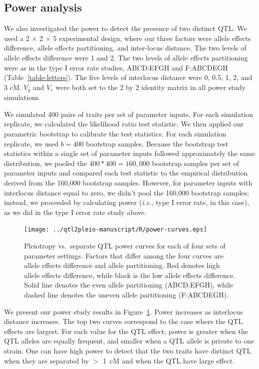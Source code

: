 \documentclass[oneside]{book}\usepackage[]{graphicx}\usepackage[]{color}
\begin{document}
\subsection{Power analysis}

We also investigated the power to detect the presence of two
distinct QTL. We used a 2 $\times$ 2 $\times$ 5 experimental design, where our
three factors were allele effects difference, allele effects
partitioning, and inter-locus distance. The two levels of allele
effects difference were 1 and 2. The two levels of allele effects
partitioning were as in the type I error rate studies, ABCD:EFGH and
F:ABCDEGH (Table~\ref{table-letters}). The five levels of interlocus
distance were 0, 0.5, 1, 2, and 3 cM. $V_g$ and $V_e$ were both set to
the 2 by 2 identity matrix in all power study simulations.

We simulated 400 pairs of traits per set of parameter inputs. For
each simulation replicate, we calculated the likelihood ratio test
statistic. We then applied our parametric bootstrap to calibrate the
test statistics. For each simulation replicate, we used $b = 400$ bootstrap
samples. Because the bootstrap test statistics within a single set of
parameter inputs followed approximately the same distribution, we
pooled the $400 * 400 = 160,000$ bootstrap samples per set of
parameter inputs and compared each test statistic to the empirical
distribution derived from the 160,000 bootstrap samples. However, for
parameter inputs with interlocus distance equal to zero, we didn't
pool the 160,000 bootstrap samples; instead, we proceeded by
calculating power (\textit{i.e.}, type I error rate, in this case), as we did in the
type I error rate study above.

\begin{figure}
\texttt{[image: ../qtl2pleio-manuscript/R/power-curves.eps]}
\caption{Pleiotropy vs.\ separate QTL power curves for each of four
  sets of parameter settings. Factors that differ among the four
  curves are allele effects difference and allele partitioning. Red denotes high allele effects difference, while black is the low allele effects difference. Solid line denotes the even allele partitioning (ABCD:EFGH), while dashed line denotes the uneven allele partitioning (F:ABCDEGH).}
\label{fig:power}
\end{figure}

We present our power study results in Figure~\ref{fig:power}.
Power increases as interlocus distance increases. The top two curves
correspond to the case where the QTL effects are largest. For each value
for the QTL effect, power is greater when the QTL alleles are equally
frequent, and smaller when a QTL allele is private to one strain. One
can have high power to detect that the two traits have distinct QTL
when they are separated by $>$ 1~cM and when the QTL have large effect.
\end{document}
